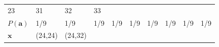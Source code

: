 \documentclass[
]{book}
\theoremstyle{definition}
\theoremstyle{definition}
\theoremstyle{definition}
\theoremstyle{remark}
\begin{document}
\begin{longtable}[]{@{}llllllllll@{}}
\begin{minipage}[t]{0.06\columnwidth}
23\strut
\end{minipage} & \begin{minipage}[t]{0.06\columnwidth}\raggedright
31\strut
\end{minipage} & \begin{minipage}[t]{0.06\columnwidth}\raggedright
32\strut
\end{minipage} & \begin{minipage}[t]{0.06\columnwidth}\raggedright
33\strut
\end{minipage}\tabularnewline
\begin{minipage}[t]{0.18\columnwidth}\raggedright
\(P(\boldsymbol{a})\)\strut
\end{minipage} & \begin{minipage}[t]{0.06\columnwidth}\raggedright
1/9\strut
\end{minipage} & \begin{minipage}[t]{0.06\columnwidth}\raggedright
1/9\strut
\end{minipage} & \begin{minipage}[t]{0.06\columnwidth}\raggedright
1/9\strut
\end{minipage} & \begin{minipage}[t]{0.06\columnwidth}\raggedright
1/9\strut
\end{minipage} & \begin{minipage}[t]{0.06\columnwidth}\raggedright
1/9\strut
\end{minipage} & \begin{minipage}[t]{0.06\columnwidth}\raggedright
1/9\strut
\end{minipage} & \begin{minipage}[t]{0.06\columnwidth}\raggedright
1/9\strut
\end{minipage} & \begin{minipage}[t]{0.06\columnwidth}\raggedright
1/9\strut
\end{minipage} & \begin{minipage}[t]{0.06\columnwidth}\raggedright
1/9\strut
\end{minipage}\tabularnewline
\begin{minipage}[t]{0.18\columnwidth}\raggedright
\(\boldsymbol{x}\)\strut
\end{minipage} & \begin{minipage}[t]{0.06\columnwidth}\raggedright
(24,24)\strut
\end{minipage} & \begin{minipage}[t]{0.06\columnwidth}\raggedright
(24,32)\strut
\end{minipage} & \begin{minipage}[t]{0.06\columnwidth}\raggedright

\end{minipage}
\end{longtable}
\end{document}
